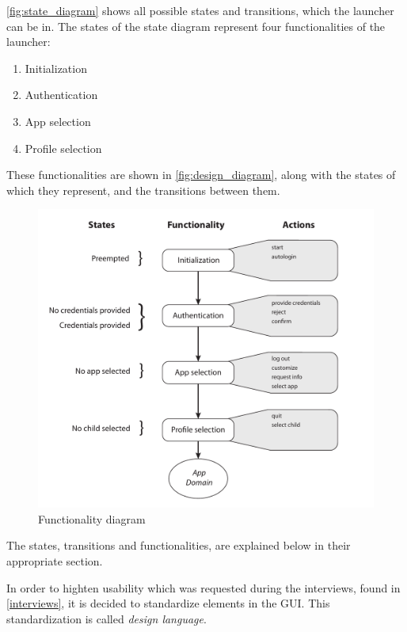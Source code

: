 \autoref{fig:state_diagram} shows all possible states and transitions, which the launcher can be in. 
The states of the state diagram represent four functionalities of the launcher:

\begin{enumerate}
	\item Initialization
	\item Authentication
	\item App selection
	\item Profile selection
\end{enumerate}


These functionalities are shown in \autoref{fig:design_diagram}, along with the states of which they represent, and the transitions between them.



\begin{figure}[h]
	\centering
	\includegraphics[width=1\textwidth]{gfx/design_diagram.pdf}
	\caption{Functionality diagram}
	\label{fig:design_diagram}
\end{figure}

The states, transitions and functionalities, are explained below in their appropriate section.

In order to highten usability which was requested during the interviews, found in \autoref{interviews}, it is decided to standardize elements in the GUI. This standardization is called \emph{design language}.